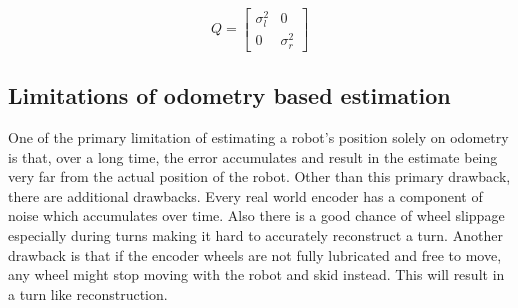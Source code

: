 \begin{equation}
\label{eq:Enc_9}
Q = 
\begin{bmatrix}
\sigma_l^2 & 0\\
0 & \sigma_r^2
\end{bmatrix}
\end{equation}

\subsection{Limitations of odometry based estimation}

One of the primary limitation of estimating a robot's position solely on odometry is that, over a long time, the error accumulates and result in the estimate being very far from the actual position of the robot. Other than this primary drawback, there are additional drawbacks. Every real world encoder has a component of noise which accumulates over time. Also there is a good chance of wheel slippage especially during turns making it hard to accurately reconstruct a turn. Another drawback is that if the encoder wheels are not fully lubricated and free to move, any wheel might stop moving with the robot and skid instead. This will result in a turn like reconstruction.